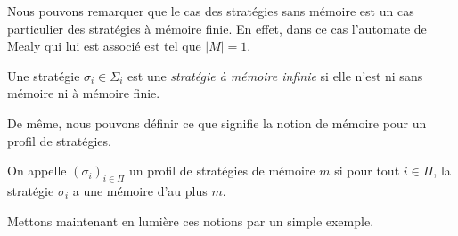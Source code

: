 Nous pouvons remarquer que le cas des stratégies sans mémoire est un cas particulier des stratégies à mémoire finie. En effet, dans ce cas l'automate de Mealy qui lui est associé est tel que $|M| = 1$.\\


\begin{defi}	
	Une stratégie $\sigma _{i} \in \Sigma _{i}$ est une \textit{stratégie à mémoire infinie } si elle n'est ni sans mémoire ni à mémoire finie.
\end{defi}

De même, nous pouvons définir ce que signifie la notion de mémoire pour un profil de stratégies.

\begin{defi}
	On appelle $(\sigma_i)_{i\in \Pi}$ un profil de stratégies de mémoire $m$ si pour tout $i\in \Pi$, la stratégie $\sigma_i$ a une mémoire d'au plus $m$.
\end{defi}

Mettons maintenant en lumière  ces notions par un simple exemple.

